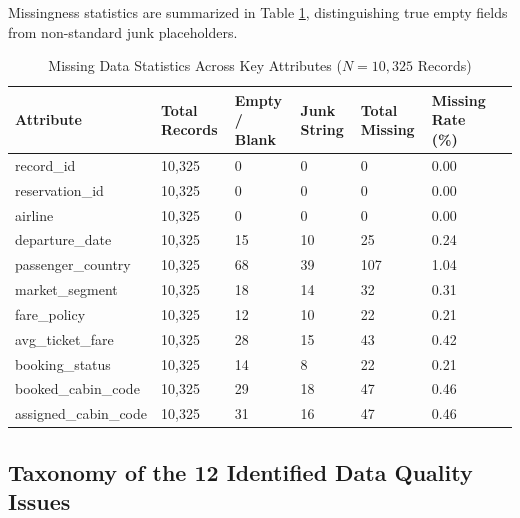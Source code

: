 \documentclass[12pt, a4paper]{report}
\begin{document}
Missingness statistics are summarized in Table \ref{tab:missing_survey}, distinguishing true empty fields from non-standard junk placeholders.

\begin{table}[H]
  \centering
  \caption{Missing Data Statistics Across Key Attributes ($N = 10,325$ Records)}
  \label{tab:missing_survey}
  \renewcommand{\arraystretch}{1.25}
  \begin{tabularx}{\textwidth}{>{\ttfamily\small}l XXXXX r}
    \toprule
    \rowcolor{TableHead}
    \normalfont\textbf{Attribute} & \textbf{Total Records} & \textbf{Empty / Blank} & \textbf{Junk String} & \textbf{Total Missing} & \textbf{Missing Rate (\%)} \\
    \midrule
    record\_id          & 10,325 & 0  & 0  & 0   & 0.00 \\
    \rowcolor{TableAlt}
    reservation\_id     & 10,325 & 0  & 0  & 0   & 0.00 \\
    airline             & 10,325 & 0  & 0  & 0   & 0.00 \\
    \rowcolor{TableAlt}
    departure\_date     & 10,325 & 15 & 10 & 25  & 0.24 \\
    passenger\_country  & 10,325 & 68 & 39 & 107 & 1.04 \\
    \rowcolor{TableAlt}
    market\_segment     & 10,325 & 18 & 14 & 32  & 0.31 \\
    fare\_policy        & 10,325 & 12 & 10 & 22  & 0.21 \\
    \rowcolor{TableAlt}
    avg\_ticket\_fare   & 10,325 & 28 & 15 & 43  & 0.42 \\
    booking\_status     & 10,325 & 14 & 8  & 22  & 0.21 \\
    \rowcolor{TableAlt}
    booked\_cabin\_code   & 10,325 & 29 & 18 & 47 & 0.46 \\
    assigned\_cabin\_code & 10,325 & 31 & 16 & 47 & 0.46 \\
    \bottomrule
  \end{tabularx}
\end{table}

\subsection{Taxonomy of the 12 Identified Data Quality Issues}
\end{document}

